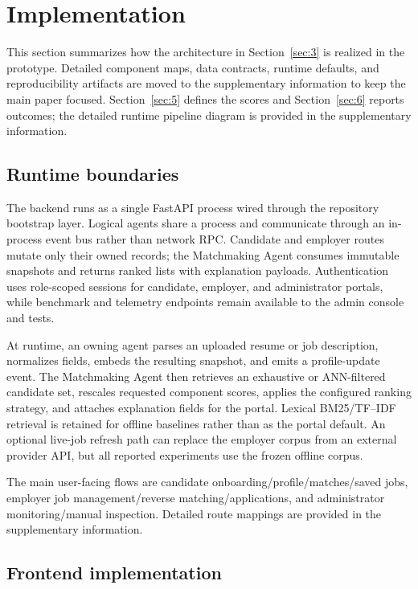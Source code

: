 \section{Implementation}\label{sec:4}

This section summarizes how the architecture in Section~\ref{sec:3} is realized in the prototype.
Detailed component maps, data contracts, runtime defaults, and reproducibility artifacts are moved to the supplementary information to keep the main paper focused.
Section~\ref{sec:5} defines the scores and Section~\ref{sec:6} reports outcomes; the detailed runtime pipeline diagram is provided in the supplementary information.

\subsection{Runtime boundaries}\label{sec:4-runtime}

The backend runs as a single FastAPI process wired through the repository bootstrap layer.
Logical agents share a process and communicate through an in-process event bus rather than network RPC.
Candidate and employer routes mutate only their owned records; the Matchmaking Agent consumes immutable snapshots and returns ranked lists with explanation payloads.
Authentication uses role-scoped sessions for candidate, employer, and administrator portals, while benchmark and telemetry endpoints remain available to the admin console and tests.

At runtime, an owning agent parses an uploaded resume or job description, normalizes fields, embeds the resulting snapshot, and emits a profile-update event.
The Matchmaking Agent then retrieves an exhaustive or ANN-filtered candidate set, rescales requested component scores, applies the configured ranking strategy, and attaches explanation fields for the portal.
Lexical BM25/TF--IDF retrieval is retained for offline baselines rather than as the portal default.
An optional live-job refresh path can replace the employer corpus from an external provider API, but all reported experiments use the frozen offline corpus.

The main user-facing flows are candidate onboarding/profile/matches/saved jobs, employer job management/reverse matching/applications, and administrator monitoring/manual inspection.
Detailed route mappings are provided in the supplementary information.

\subsection{Frontend implementation}\label{sec:4-frontend}

